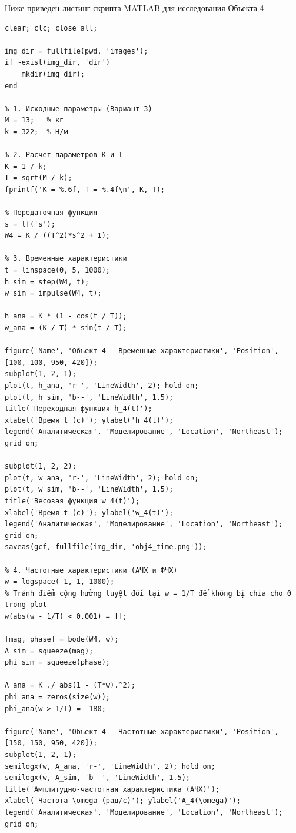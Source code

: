 \documentclass[12pt, a4paper]{article}
\begin{document}
Ниже приведен листинг скрипта MATLAB для исследования Объекта 4.

\begin{lstlisting}[caption={Скрипт MATLAB для исследования Объекта 4}]
clear; clc; close all;

img_dir = fullfile(pwd, 'images');
if ~exist(img_dir, 'dir')
    mkdir(img_dir);
end

% 1. Исходные параметры (Вариант 3)
M = 13;   % кг
k = 322;  % Н/м

% 2. Расчет параметров K и T
K = 1 / k;
T = sqrt(M / k);
fprintf('K = %.6f, T = %.4f\n', K, T);

% Передаточная функция
s = tf('s');
W4 = K / ((T^2)*s^2 + 1);

% 3. Временные характеристики
t = linspace(0, 5, 1000);
h_sim = step(W4, t);
w_sim = impulse(W4, t);

h_ana = K * (1 - cos(t / T));
w_ana = (K / T) * sin(t / T);

figure('Name', 'Объект 4 - Временные характеристики', 'Position', [100, 100, 950, 420]);
subplot(1, 2, 1);
plot(t, h_ana, 'r-', 'LineWidth', 2); hold on;
plot(t, h_sim, 'b--', 'LineWidth', 1.5);
title('Переходная функция h_4(t)');
xlabel('Время t (с)'); ylabel('h_4(t)');
legend('Аналитическая', 'Моделирование', 'Location', 'Northeast'); grid on;

subplot(1, 2, 2);
plot(t, w_ana, 'r-', 'LineWidth', 2); hold on;
plot(t, w_sim, 'b--', 'LineWidth', 1.5);
title('Весовая функция w_4(t)');
xlabel('Время t (с)'); ylabel('w_4(t)');
legend('Аналитическая', 'Моделирование', 'Location', 'Northeast'); grid on;
saveas(gcf, fullfile(img_dir, 'obj4_time.png'));

% 4. Частотные характеристики (АЧХ и ФЧХ)
w = logspace(-1, 1, 1000);
% Tránh điểm cộng hưởng tuyệt đối tại w = 1/T để không bị chia cho 0 trong plot
w(abs(w - 1/T) < 0.001) = []; 

[mag, phase] = bode(W4, w);
A_sim = squeeze(mag);
phi_sim = squeeze(phase);

A_ana = K ./ abs(1 - (T*w).^2);
phi_ana = zeros(size(w));
phi_ana(w > 1/T) = -180;

figure('Name', 'Объект 4 - Частотные характеристики', 'Position', [150, 150, 950, 420]);
subplot(1, 2, 1);
semilogx(w, A_ana, 'r-', 'LineWidth', 2); hold on;
semilogx(w, A_sim, 'b--', 'LineWidth', 1.5);
title('Амплитудно-частотная характеристика (АЧХ)');
xlabel('Частота \omega (рад/с)'); ylabel('A_4(\omega)');
legend('Аналитическая', 'Моделирование', 'Location', 'Northeast'); grid on;


\end{lstlisting}
\end{document}
